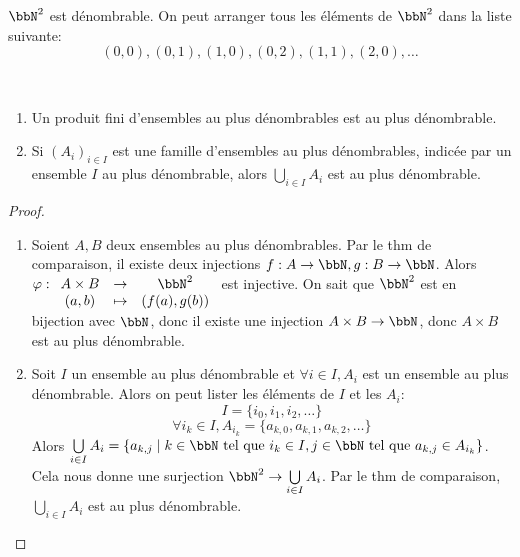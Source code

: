 \begin{exem}
    $\bbN^2$ est dénombrable.
    On peut arranger tous les éléments de $\bbN^2$ dans la liste suivante:
    \[ (0, 0), (0, 1), (1, 0), (0, 2), (1, 1), (2, 0), \ldots \]
\end{exem}

\begin{thm} $\ $
    \begin{enumerate}
        \item Un produit fini d'ensembles au plus dénombrables est au plus dénombrable.
        \item Si $(A_i)_{i \in I}$ est une famille d'ensembles au plus dénombrables,
              indicée par un ensemble $I$ au plus dénombrable,
              alors $\bigcup\limits_{i \in I} A_i$ est au plus dénombrable.
    \end{enumerate}
\end{thm}

\begin{proof}
    $\ $
    \begin{enumerate}
        \item
              Soient $A, B$ deux ensembles au plus dénombrables.
              Par le thm de comparaison, il existe deux injections $f: A \to \bbN, g: B \to \bbN$.
              Alors $\varphi:
                  \begin{array}[t]{ccc}
                      A \times B & \to & \bbN^2       \\
                      (a, b)     & \tp & (f(a), g(b))
                  \end{array}
              $ est injective.
              On sait que $\bbN^2$ est en bijection avec $\bbN$,
              donc il existe une injection $A \times B \to \bbN$,
              donc $A \times B$ est au plus dénombrable.
        \item
              Soit $I$ un ensemble au plus dénombrable et $\forall i \in I, A_i$ est un ensemble au plus dénombrable.
              Alors on peut lister les éléments de $I$ et les $A_i$:
              \[ I = \{ i_0, i_1, i_2, \ldots \} \]
              \[ \forall i_k \in I, A_{i_k} = \{ a_{k, 0}, a_{k, 1}, a_{k, 2}, \ldots \} \]
              Alors $\bigcup\limits_{i \in I} A_i =
                  \{ a_{k, j} \mid k \in \bbN \text{ tel que } i_k \in I, j \in \bbN \text{ tel que } a_{k, j} \in A_{i_k} \}$.
              Cela nous donne une surjection $\bbN^2 \to \bigcup\limits_{i \in I} A_i$.
              Par le thm de comparaison, $\bigcup\limits_{i \in I} A_i$ est au plus dénombrable.
    \end{enumerate}
\end{proof}

